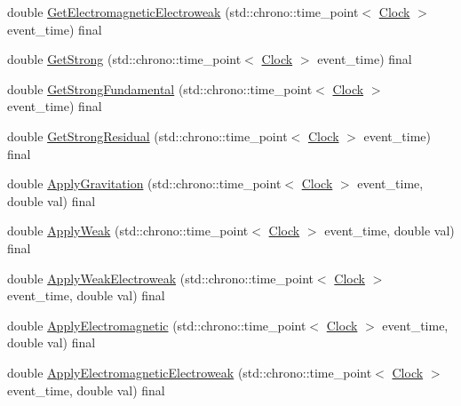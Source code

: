 \begin{DoxyCompactItemize}
\item 
double \mbox{\hyperlink{classDimension_ae1babb1fa280c35966d7ee3de6655e4d}{Get\+Electromagnetic\+Electroweak}} (std\+::chrono\+::time\+\_\+point$<$ \mbox{\hyperlink{universe_8h_a0ef8d951d1ca5ab3cfaf7ab4c7a6fd80}{Clock}} $>$ event\+\_\+time) final
\item 
double \mbox{\hyperlink{classDimension_ae36aadad4ae84735a5ff73bff4eb97b1}{Get\+Strong}} (std\+::chrono\+::time\+\_\+point$<$ \mbox{\hyperlink{universe_8h_a0ef8d951d1ca5ab3cfaf7ab4c7a6fd80}{Clock}} $>$ event\+\_\+time) final
\item 
double \mbox{\hyperlink{classDimension_ad0d067d7f9dc4841b0ad280979ebe7af}{Get\+Strong\+Fundamental}} (std\+::chrono\+::time\+\_\+point$<$ \mbox{\hyperlink{universe_8h_a0ef8d951d1ca5ab3cfaf7ab4c7a6fd80}{Clock}} $>$ event\+\_\+time) final
\item 
double \mbox{\hyperlink{classDimension_aeee6025f17d9cd1bf7f324d715a30691}{Get\+Strong\+Residual}} (std\+::chrono\+::time\+\_\+point$<$ \mbox{\hyperlink{universe_8h_a0ef8d951d1ca5ab3cfaf7ab4c7a6fd80}{Clock}} $>$ event\+\_\+time) final
\item 
double \mbox{\hyperlink{classDimension_a9474b0dd3f6321a92bfe4375bb4b2266}{Apply\+Gravitation}} (std\+::chrono\+::time\+\_\+point$<$ \mbox{\hyperlink{universe_8h_a0ef8d951d1ca5ab3cfaf7ab4c7a6fd80}{Clock}} $>$ event\+\_\+time, double val) final
\item 
double \mbox{\hyperlink{classDimension_a72b8ab8d676b4df6b9a6ef948f5693c9}{Apply\+Weak}} (std\+::chrono\+::time\+\_\+point$<$ \mbox{\hyperlink{universe_8h_a0ef8d951d1ca5ab3cfaf7ab4c7a6fd80}{Clock}} $>$ event\+\_\+time, double val) final
\item 
double \mbox{\hyperlink{classDimension_abf490cabd486afa660f17940ed0d17e6}{Apply\+Weak\+Electroweak}} (std\+::chrono\+::time\+\_\+point$<$ \mbox{\hyperlink{universe_8h_a0ef8d951d1ca5ab3cfaf7ab4c7a6fd80}{Clock}} $>$ event\+\_\+time, double val) final
\item 
double \mbox{\hyperlink{classDimension_a65bcd3c09792cf53b1f614eff49cf111}{Apply\+Electromagnetic}} (std\+::chrono\+::time\+\_\+point$<$ \mbox{\hyperlink{universe_8h_a0ef8d951d1ca5ab3cfaf7ab4c7a6fd80}{Clock}} $>$ event\+\_\+time, double val) final
\item 
double \mbox{\hyperlink{classDimension_ab13e8ed50a4373274636e542c917db01}{Apply\+Electromagnetic\+Electroweak}} (std\+::chrono\+::time\+\_\+point$<$ \mbox{\hyperlink{universe_8h_a0ef8d951d1ca5ab3cfaf7ab4c7a6fd80}{Clock}} $>$ event\+\_\+time, double val) final
\item 

\end{DoxyCompactItemize}

